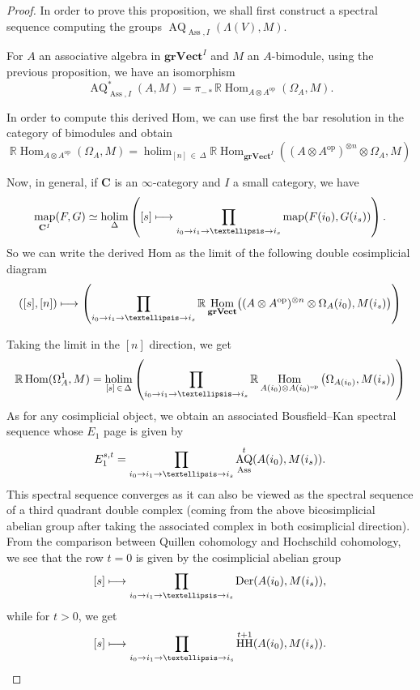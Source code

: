 \documentclass[10pt]{amsart}
\theoremstyle{definition}\newtheorem{defi}[theo]{Definition}\newtheorem{rema}[theo]{Remark}\newtheorem{exam}[theo]{Example}\newtheorem{exem}[theo]{Example}\newtheorem{nota}[theo]{Notation}
\DeclareMathOperator{\opp}{op}
\DeclareMathOperator{\Ass}{Ass}
\DeclareMathOperator{\holim}{holim}
\DeclareMathOperator{\Hom}{Hom}
\DeclareMathOperator{\mapp}{map}
\DeclareMathOperator{\HH}{HH}
\DeclareMathOperator{\Der}{Der}
\DeclareMathOperator{\AQ}{AQ}
\newcommand{\grVect}{\mathbf{grVect}}
\newcommand{\bfC}{\mathbf{C}}
\newcommand{\RR}{\mathbb{R}}
\renewcommand*{\to}{\mathchoice{\longrightarrow}{\rightarrow}{\rightarrow}{\rightarrow}}
\let\oldmapsto\mapsto
\renewcommand*{\mapsto}{\mathchoice{\longmapsto}{\oldmapsto}{\oldmapsto}{\oldmapsto}}
\begin{document}
\begin{proof}
In order to prove this proposition, we shall first construct a spectral sequence computing the groups $\AQ_{\Ass,I}(\Lambda(V),M)$.



For $A$ an associative algebra in $\grVect^I$ and $M$ an $A$-bimodule, using the previous proposition, we have an isomorphism
\[
\AQ^*_{\Ass,I}(A,M)=\pi_{-*}\RR\Hom_{A\otimes A^{\opp}}(\Omega_A,M).
\]

In order to compute this derived Hom, we can use first the bar resolution in the category of bimodules and obtain
\[
\RR\Hom_{A\otimes A^{\opp}}(\Omega_A,M)=\holim_{[n]\,\in\,\Delta}\RR\Hom_{\grVect^I}\left((A\otimes A^{\opp})^{\otimes n}\otimes\Omega_A,M\right)
\]



Now, in general, if $\bfC$ is an $\infty$-category and $I$ a small category, we have
\[
\mapp_{\bfC^I}(F,G)\simeq\holim_{\Delta}\left([s]\mapsto\prod_{i_0\to i_1\to\ldots\to i_s} \mapp(F(i_0),G(i_s))\right).
\]
So we can write the derived Hom as the limit of the following double cosimplicial diagram
\[
([s],[n])\mapsto \left(\prod_{i_0\to i_1\to\ldots\to i_s}\RR\Hom_{\grVect}\bigl((A\otimes A^{\opp})^{\otimes n}\otimes\Omega_A(i_0),M(i_s)\bigr)\right)
\]


Taking the limit in the $[n]$ direction, we get
\[
\RR\Hom(\Omega_A^1,M)=\holim_{[s]\,\in\,\Delta}\left(\prod_{i_0\to i_1\to\ldots\to i_s}\RR\Hom_{A(i_0)\otimes A(i_0)^{\opp}}\left(\Omega_{A(i_0)},M(i_s)\right)\right)
\]
As for any cosimplicial object, we obtain an associated Bousfield--Kan spectral sequence whose $E_1$ page is given by
\[
E_1^{s,t}=\prod_{i_0\to i_1\to\ldots\to i_s}\AQ^{t}_{\Ass}(A(i_0),M(i_s)).
\]
This spectral sequence converges as it can also be viewed as the spectral sequence of a third quadrant double complex (coming from the above bicosimplicial abelian group after taking the associated complex in both cosimplicial direction). From the comparison between Quillen cohomology and Hochschild cohomology, we see that the row $t=0$ is given by the cosimplicial abelian group
\[
[s]\mapsto \prod_{i_0\to i_1\to\ldots\to i_s}\Der(A(i_0),M(i_s)),
\]
while for $t>0$, we get
\[
[s]\mapsto \prod_{i_0\to i_1\to\ldots\to i_s}\HH^{t+1}(A(i_0),M(i_s)).
\]


\end{proof}
\end{document}
